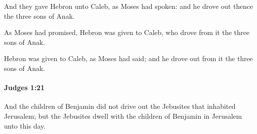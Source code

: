 			\begin{versebox}
					\item[BHS] 
					\item[ASV] And they gave Hebron unto Caleb, as Moses had spoken: and he drove out thence the three sons of Anak.
					\item[NIV] As Moses had promised, Hebron was given to Caleb, who drove from it the three sons of Anak.
					\item[NRSV] Hebron was given to Caleb, as Moses had said; and he drove out from it the three sons of Anak.
			\end{versebox}

		\paragraph{Judges 1:21} %
			\label{JUDGES-1-21}

			And the children of Benjamin did not drive out the Jebusites that inhabited Jerusalem; but the Jebusites dwell with the children of Benjamin in Jerusalem unto this day.

